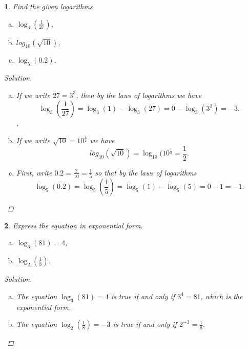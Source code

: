 \documentclass[12pt]{amsart}
\newtheorem{thm}{}
\begin{document}
\setcounter{thm}{23} 
\begin{thm}
  Find the given logarithms
  \begin{enumerate}[(a)]
  \item
    $\log_3\left(\frac{1}{27}\right)$,
  \item
    $log_{10}(\sqrt{10})$,
  \item
    $\log_5(0.2)$.
  \end{enumerate}
  
  \begin{proof}[Solution]
    \begin{enumerate}[(a)]
    \item
      If we write $27 = 3^3$, then by the laws of logarithms we have
      $$\log_3\left(\frac{1}{27}\right) = \log_3(1) - \log_3(27) = 0 - \log_3(3^3) = -3.$$,
    \item
      If we write $\sqrt{10} = 10^{\frac{1}{2}}$ we have
      $$log_{10}(\sqrt{10}) = \log_{10}(10^{\frac{1}{2}} = \frac{1}{2}.$$
    \item
      First, write $0.2 = \frac{2}{10} = \frac{1}{5}$ so that by the laws of logarithms
      $$\log_5(0.2) = \log_5\left(\frac{1}{5}\right) = \log_5(1) - \log_5(5) = 0 - 1 = -1.$$
    \end{enumerate}
  \end{proof}
\end{thm}

\setcounter{thm}{31} 
\begin{thm}
  Express the equation in exponential form.
  \begin{enumerate}[(a)]
  \item
    $\log_3(81) = 4$,
  \item
    $\log_2\left(\frac{1}{8}\right)$.
  \end{enumerate}
  \begin{proof}[Solution]
    \begin{enumerate}[(a)]
    \item
      The equation $\log_3(81) = 4$ is true if and only if $3^4 = 81$, which is the exponential form.
    \item
      The equation $\log_2\left(\frac{1}{8}\right) = -3$ is true if and only if $2^{-3} = \frac{1}{8}$.
    \end{enumerate}
  \end{proof}
\end{thm}
\end{document}
